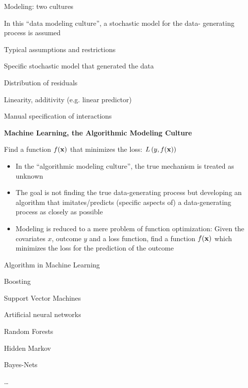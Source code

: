 \documentclass[11pt,compress,t,notes=noshow, xcolor=table]{beamer}
\begin{document}
\begin{vbframe}{Modeling: two cultures}
\framebreak

In this \enquote{data modeling culture}, a stochastic model for the data- generating process is assumed
\begin{blocki}{Typical assumptions and restrictions}
  \item Specific stochastic model that generated the data
  \item Distribution of residuals
  \item Linearity, additivity (e.g. linear predictor)
  \item Manual specification of interactions
\end{blocki}

\framebreak

\textbf{Machine Learning, the Algorithmic Modeling Culture}
\lz
  \begin{center}
  \end{center}
\lz
Find a function $f(\mathbf{x})$ that minimizes the loss: $L\left(y, f(\mathbf{x})\right)$

\framebreak

\begin{itemize}
  \item In the \enquote{algorithmic modeling culture}, the true mechanism is treated as unknown
  \item The goal is not finding the true data-generating process but developing an algorithm that imitates/predicts (specific aspects of) a data-generating process as closely as possible
  \item Modeling is reduced to a mere problem of function optimization: Given the covariates $x$, outcome $y$ and a loss function, find a function $f(\mathbf{x})$ which minimizes the loss for the prediction of the outcome
\end{itemize}
\begin{blocki}{Algorithm in Machine Learning}
  \item Boosting
  \item Support Vector Machines
  \item Artificial neural networks
  \item Random Forests
  \item Hidden Markov
  \item Bayes-Nets
  \item \ldots
\end{blocki}


\end{vbframe}
\end{document}
